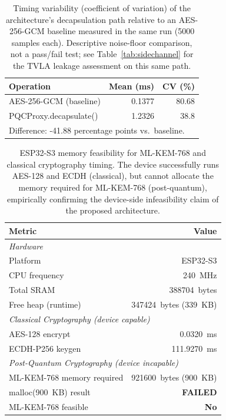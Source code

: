 \begin{table}[t]\centering
\caption{Timing variability (coefficient of variation) of the architecture's decapsulation path relative to an AES-256-GCM baseline measured in the same run (5000 samples each). Descriptive noise-floor comparison, not a pass/fail test; see Table~\ref{tab:sidechannel} for the TVLA leakage assessment on this same path.}
\label{tab:cvbaseline}
\begin{tabular}{lrr}
\hline
Operation & Mean (ms) & CV (\%) \\
\hline
AES-256-GCM (baseline) & 0.1377 & 80.68 \\
PQCProxy.decapsulate() & 1.2326 & 38.8 \\
\hline
\multicolumn{3}{l}{Difference: -41.88 percentage points vs.\ baseline.} \\
\end{tabular}\end{table}

\begin{table}[t]\centering
\caption{ESP32-S3 memory feasibility for ML-KEM-768 and classical cryptography timing. The device successfully runs AES-128 and ECDH (classical), but cannot allocate the memory required for ML-KEM-768 (post-quantum), empirically confirming the device-side infeasibility claim of the proposed architecture.}
\label{tab:esp32}
\begin{tabular}{lr}
\hline
Metric & Value \\
\hline
\multicolumn{2}{l}{\textit{Hardware}} \\
\hline
Platform & ESP32-S3 \\
CPU frequency & 240~MHz \\
Total SRAM & 388704~bytes \\
Free heap (runtime) & 347424~bytes (339~KB) \\
\hline
\multicolumn{2}{l}{\textit{Classical Cryptography (device capable)} } \\
\hline
AES-128 encrypt & 0.0320~ms \\
ECDH-P256 keygen & 111.9270~ms \\
\hline
\multicolumn{2}{l}{\textit{Post-Quantum Cryptography (device incapable)} } \\
\hline
ML-KEM-768 memory required & 921600~bytes (900~KB) \\
malloc(900~KB) result & \textbf{FAILED} \\
ML-KEM-768 feasible & \textbf{No} \\
\hline
\end{tabular}\end{table}

